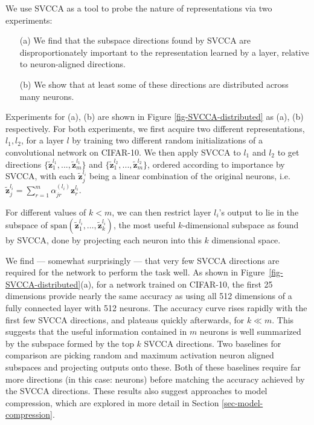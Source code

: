 \documentclass{article} %
\begin{document}
We use SVCCA as a tool to probe the nature of representations via two experiments:

\begin{enumerate}
    \item[(a)] We find that the subspace directions found by SVCCA are disproportionately important to the representation learned by a layer, relative to neuron-aligned directions.
    \item[(b)] We show that at least some of these directions are distributed across many neurons.
\end{enumerate}


Experiments for (a), (b) are shown in Figure \ref{fig-SVCCA-distributed} as (a), (b) respectively. For both experiments, we first acquire two different representations, $l_1, l_2$, for a layer $l$ by training two different random initializations of a convolutional network on CIFAR-10. We then apply SVCCA to $l_1$ and $l_2$ to get directions $\{ \tilde{\pmb{z}}_1^{l_1},..., \tilde{\pmb{z}}_m^{l_1} \}$ and $\{\tilde{\pmb{z}}_1^{l_2},..., \tilde{\pmb{z}}_m^{l_2} \}$, ordered according to importance by SVCCA, with each $\tilde{\pmb{z}}_j^{l_i}$ being a linear combination of the original neurons, i.e. $\tilde{\pmb{z}}_j^{l_i} = \sum_{r=1}^m \alpha^{(l_i)}_{jr}\pmb{z}^{l_i}_r $.

For different values of $k < m$, we can then restrict layer $l_i$'s output to lie in the subspace of $\mathrm{span}(\tilde{\pmb{z}}_1^{l_i}, \ldots, \tilde{\pmb{z}}_k^{l_i})$, the most useful $k$-dimensional subspace as found by SVCCA, done by projecting each neuron into this $k$ dimensional space.

We find --- somewhat surprisingly --- that very few SVCCA directions are required
for the network to perform the task well. As shown in Figure~\ref{fig-SVCCA-distributed}(a),
for a network trained on CIFAR-10, the first 25 dimensions provide nearly the same accuracy as using all 512 dimensions of a fully connected layer with 512 neurons.
The accuracy curve rises rapidly with the first few SVCCA directions, and plateaus quickly afterwards, for $k \ll m$. This suggests that the useful information contained in $m$ neurons is well summarized by the subspace formed by the top $k$ SVCCA directions. Two baselines for comparison are picking random and maximum activation neuron aligned subspaces and projecting outputs onto these. Both of these baselines require far more directions (in this case: neurons) before matching the accuracy achieved by the SVCCA directions.
These results also suggest approaches to model compression, which are explored in more detail in Section \ref{sec-model-compression}. 
\end{document}
